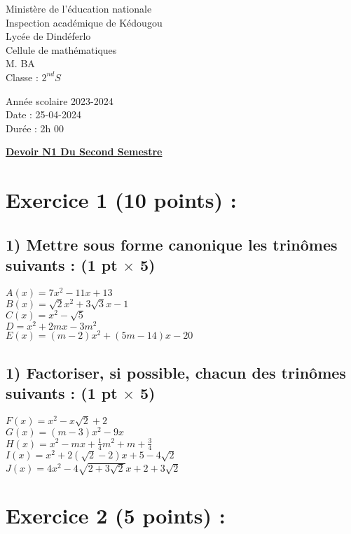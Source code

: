 \documentclass[12pt]{article}
\begin{document}
\begin{minipage}{0.5\textwidth}
	Ministère de l'éducation nationale  \\
	Inspection académique de Kédougou   \\
	Lycée de Dindéferlo            \\
	Cellule de mathématiques            \\
	M. BA                          \\
	Classe : $2^{nd}S$  \\
\end{minipage}
\begin{minipage}{0.5\textwidth}
	Année scolaire 2023-2024 \\
	Date : 25-04-2024 \\
	Durée : 2h 00 \\
\end{minipage}

\begin{center}
	\textbf{{\underline{Devoir N1 Du Second Semestre}}}
\end{center}

\section*{Exercice 1 (10 points) :}
\subsection*{1) Mettre sous forme canonique les trinômes suivants : (1 pt $\times$ 5)}
$A(x) = 7x^{2}-11x + 13$\\
$B(x) =\sqrt{2}x^{2}+3\sqrt{3}x-1$\\
$C(x) =x^{2}-\sqrt{5}$\\
$D =x^{2} + 2mx-3m^{2}$\\
$E(x) =(m-2)x^{2}+(5m-14)x-20$
\subsection*{1) Factoriser, si possible, chacun des trinômes suivants : (1 pt $\times$ 5)}
$F(x) =x^{2}-x\sqrt{2}+2$\\
$G(x)=(m-3)x^{2}-9x$\\ 
$H(x)=x^{2}-mx +\frac{1}{4}m^{2}+m+\frac{3}{4}$\\ 
$I(x)= x^{2} + 2(\sqrt{2}-2)x+5-4\sqrt{2}$\\ 
$J(x)=4x^{2}-4\sqrt{2+3\sqrt{2}}x+2+3\sqrt{2}$\\
\section*{Exercice 2 (5 points) :}
\end{document}
